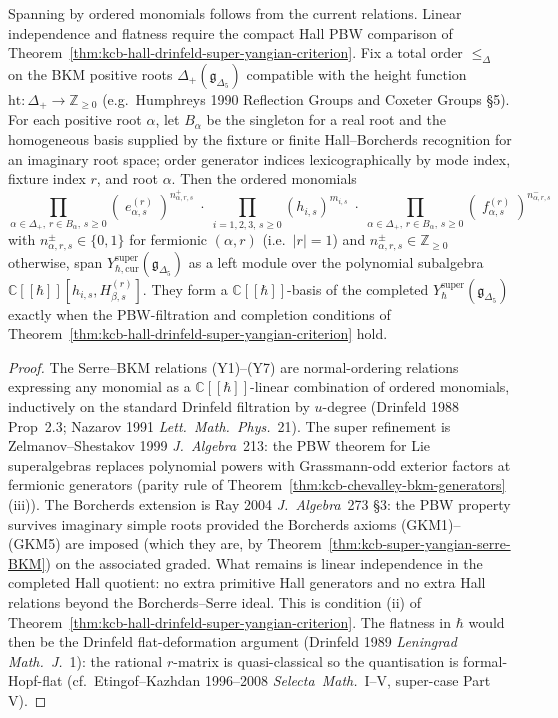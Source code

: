 \begin{proposition}
\label{prop:kcb-super-yangian-PBW}
Spanning by ordered monomials follows from the current relations.
Linear independence and flatness require the compact Hall PBW
comparison of
Theorem~\ref{thm:kcb-hall-drinfeld-super-yangian-criterion}.
Fix a total order $\leq_\Delta$ on the BKM positive roots
$\Delta_+(\mathfrak{g}_{\Delta_5})$ compatible with the height function
$\mathrm{ht}:\Delta_+\to\mathbb{Z}_{\geq 0}$ (e.g.\ Humphreys 1990
\textup{Reflection Groups and Coxeter Groups} \S5). For each positive
root $\alpha$, let $B_\alpha$ be the singleton for a real root and the
homogeneous basis supplied by the fixture or finite Hall--Borcherds
recognition for an imaginary root space; order generator indices
lexicographically by mode index, fixture index $r$, and root $\alpha$.
Then the ordered monomials
\[
 \prod_{\alpha\in\Delta_+,\,r\in B_\alpha,\,s\geq 0}
 (\;e_{\alpha,s}^{(r)}\;)^{n^+_{\alpha,r,s}}
 \;\cdot\;
 \prod_{i=1,2,3,\,s\geq 0}(h_{i,s})^{m_{i,s}}
 \;\cdot\;
 \prod_{\alpha\in\Delta_+,\,r\in B_\alpha,\,s\geq 0}
 (\;f_{\alpha,s}^{(r)}\;)^{n^-_{\alpha,r,s}}
\]
with $n^\pm_{\alpha,r,s}\in\{0,1\}$ for fermionic $(\alpha,r)$ (i.e.\
$|r|=1$) and $n^\pm_{\alpha,r,s}\in\mathbb{Z}_{\geq 0}$ otherwise,
span
$Y_{\hbar,\mathrm{cur}}^{\mathrm{super}}(\mathfrak{g}_{\Delta_5})$ as a left
module over the polynomial subalgebra
$\mathbb{C}[[\hbar]][h_{i,s}, H_{\beta,s}^{(r)}]$. They form a
$\mathbb{C}[[\hbar]]$-basis of the completed
$Y_\hbar^{\mathrm{super}}(\mathfrak{g}_{\Delta_5})$ exactly when the
PBW-filtration and completion conditions of
Theorem~\ref{thm:kcb-hall-drinfeld-super-yangian-criterion} hold.
\end{proposition}

\begin{proof}
The Serre--BKM relations (Y1)--(Y7) are normal-ordering relations
expressing any monomial as a $\mathbb{C}[[\hbar]]$-linear combination
of ordered monomials, inductively on the standard Drinfeld filtration
by $u$-degree (Drinfeld 1988 Prop~2.3; Nazarov 1991
\emph{Lett.~Math.~Phys.}~21). The super refinement is Zelmanov--Shestakov
1999 \emph{J.~Algebra}~213: the PBW theorem for Lie superalgebras
replaces polynomial powers with Grassmann-odd exterior factors at
fermionic generators (parity rule of
Theorem~\ref{thm:kcb-chevalley-bkm-generators}(iii)). The Borcherds
extension is Ray 2004 \emph{J.~Algebra}~273 \S3: the PBW property
survives imaginary simple roots provided the Borcherds axioms (GKM1)--(GKM5)
are imposed (which they are, by
Theorem~\ref{thm:kcb-super-yangian-serre-BKM}) on the associated
graded. What remains is linear independence in the completed Hall
quotient: no extra primitive Hall generators and no extra Hall relations
beyond the Borcherds--Serre ideal. This is condition \textup{(ii)} of
Theorem~\ref{thm:kcb-hall-drinfeld-super-yangian-criterion}. The flatness
in $\hbar$ would then be the Drinfeld flat-deformation argument (Drinfeld 1989
\emph{Leningrad Math.~J.}~1): the rational $r$-matrix is quasi-classical
so the quantisation is formal-Hopf-flat (cf.\ Etingof--Kazhdan 1996--2008
\emph{Selecta~Math.}~I--V, super-case Part V).
\end{proof}

